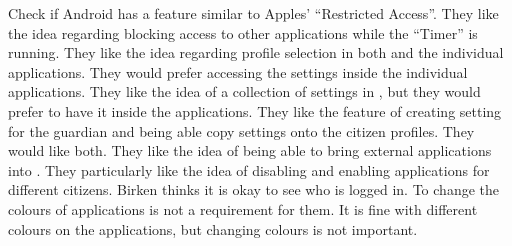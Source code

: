 Check if Android has a feature similar to Apples' ``Restricted Access''.
They like the idea regarding blocking access to other applications while the ``Timer'' is running.
They like the idea regarding profile selection in both \launcher and the individual applications.
They would prefer accessing the settings inside the individual applications.
They like the idea of a collection of settings in \launcher, but they would prefer to have it inside the applications.
They like the feature of creating setting for the guardian and being able copy settings onto the citizen profiles.
They would like both.
They like the idea of being able to bring external applications into \launcher.
They particularly like the idea of disabling and enabling applications for different citizens.
Birken thinks it is okay to see who is logged in.
To change the colours of applications is not a requirement for them.
It is fine with different colours on the applications, but changing colours is not important.